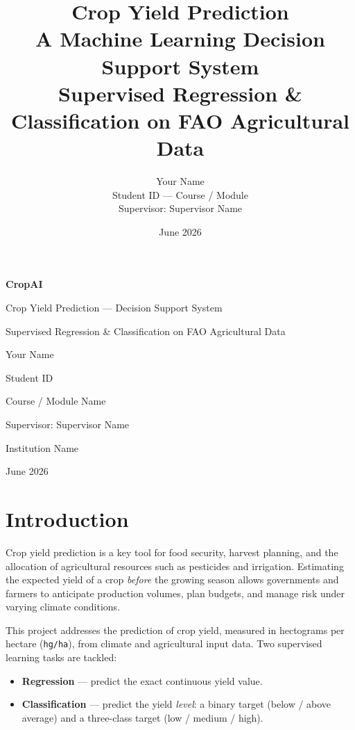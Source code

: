 \documentclass[11pt,a4paper]{article}
\title{\textbf{Crop Yield Prediction}\\[4pt]
\large A Machine Learning Decision Support System\\
\normalsize Supervised Regression \& Classification on FAO Agricultural Data}
\author{Your Name \\ \small Student ID --- Course / Module \\ \small Supervisor: Supervisor Name}
\date{June 2026}
\begin{document}
\begin{titlepage}
\centering
\vspace*{2cm}
{\Huge\bfseries\color{cropgreen} CropAI\par}
\vspace{0.5cm}
{\LARGE Crop Yield Prediction --- Decision Support System\par}
\vspace{0.4cm}
{\large Supervised Regression \& Classification on FAO Agricultural Data\par}
\vfill
{\large Your Name\par}
{\normalsize Student ID\par}
\vspace{0.3cm}
{\normalsize Course / Module Name\par}
{\normalsize Supervisor: Supervisor Name\par}
\vspace{1cm}
{\normalsize Institution Name \par}
{\normalsize June 2026\par}
\vfill
\end{titlepage}

\tableofcontents
\newpage

\section{Introduction}

Crop yield prediction is a key tool for food security, harvest planning, and
the allocation of agricultural resources such as pesticides and irrigation.
Estimating the expected yield of a crop \emph{before} the growing season allows
governments and farmers to anticipate production volumes, plan budgets, and
manage risk under varying climate conditions.

This project addresses the prediction of crop yield, measured in hectograms per
hectare (\texttt{hg/ha}), from climate and agricultural input data. Two
supervised learning tasks are tackled:
\begin{itemize}[noitemsep]
  \item \textbf{Regression} --- predict the exact continuous yield value.
  \item \textbf{Classification} --- predict the yield \emph{level}: a binary
        target (below / above average) and a three-class target
        (low / medium / high).
\end{itemize}
\end{document}
